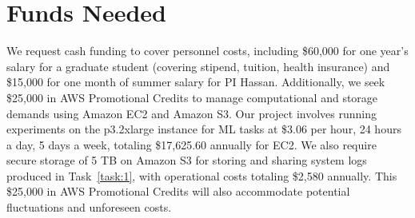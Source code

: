 \section*{Funds Needed}

We request cash funding to cover personnel costs, including \$60,000 for one year's salary for a graduate student (covering stipend, tuition, health insurance) and \$15,000 for one month of summer salary for PI Hassan. Additionally, we seek \$25,000 in AWS Promotional Credits to manage computational and storage demands using Amazon EC2 and Amazon S3. Our project involves running experiments on the p3.2xlarge instance for ML tasks at \$3.06 per hour, 24 hours a day, 5 days a week, totaling \$17,625.60 annually for EC2. We also require secure storage of 5 TB on Amazon S3 for storing and sharing system logs produced in Task~\ref{task:1}, with operational costs totaling \$2,580 annually. This \$25,000 in AWS Promotional Credits will also accommodate potential fluctuations and unforeseen costs.












